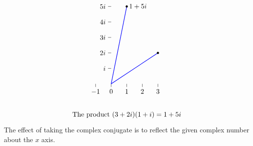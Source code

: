\begin{equation*}
\begin{tikzpicture}[scale=0.8]
\begin{scope}[xshift=14cm]
      \draw(0,1) -- +(-0.2,0) node[left] {$i$};
      \draw(0,2) -- +(-0.2,0) node[left] {$2i$};
      \draw(0,3) -- +(-0.2,0) node[left] {$3i$};
      \draw(0,4) -- +(-0.2,0) node[left] {$4i$};
      \draw(0,5) -- +(-0.2,0) node[left] {$5i$};
      \draw(-1,0) -- +(0,-0.2) node[below] {$-1$};
      \draw(0,0) -- +(0,-0.2) node[below] {$0$};
      \draw(1,0) -- +(0,-0.2) node[below] {$1$};
      \draw(2,0) -- +(0,-0.2) node[below] {$2$};
      \draw(3,0) -- +(0,-0.2) node[below] {$3$};
      \draw[thick, blue] (0,0) -- (3,2);
      \draw[fill, black] (3,2) circle [radius=1.8pt];
      \draw[thick, blue] (0,0) -- (1,5);
      \draw[fill, black] (1,5) circle [radius=1.8pt] node [right] {$1+5i$};
      \draw (1,-2) node {The product $(3+2i)(1+i)=1+5i$};
    \end{scope}
  \end{tikzpicture}
\end{equation*}
The effect of taking the complex conjugate is to reflect the given
complex number about the $x$ axis.
